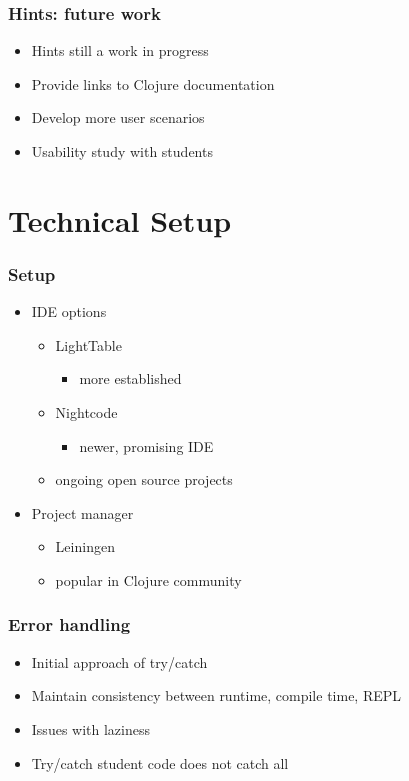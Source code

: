 \documentclass{beamer}
\begin{document}
\begin{frame}
\frametitle{Hints: future work}
	\begin{itemize}
	 \item Hints still a work in progress
	 \item Provide links to Clojure documentation
  	 \item Develop more user scenarios
  	 \item Usability study with students
	 \end{itemize}
\end{frame}

\section{Technical Setup}

\begin{frame}
\frametitle{Setup}
	\begin{itemize}
	\item IDE options
	\begin{itemize}
		\item LightTable
			\begin{itemize}
				\item more established
			\end{itemize}
		\item Nightcode
			\begin{itemize}
				\item newer, promising IDE
			\end{itemize}
		\item ongoing open source projects
	\end{itemize}
	\item Project manager
	\begin{itemize}
		\item Leiningen
		\item popular in Clojure community
	\end{itemize}
	\end{itemize}
\end{frame}

\begin{frame}
	\frametitle {Error handling}
	\begin{itemize}
		\item Initial approach of try/catch
		\item Maintain consistency between runtime, compile time, REPL
		\item Issues with laziness
		\item Try/catch student code does not catch all
	\end{itemize}
\end{frame}
\end{document}
